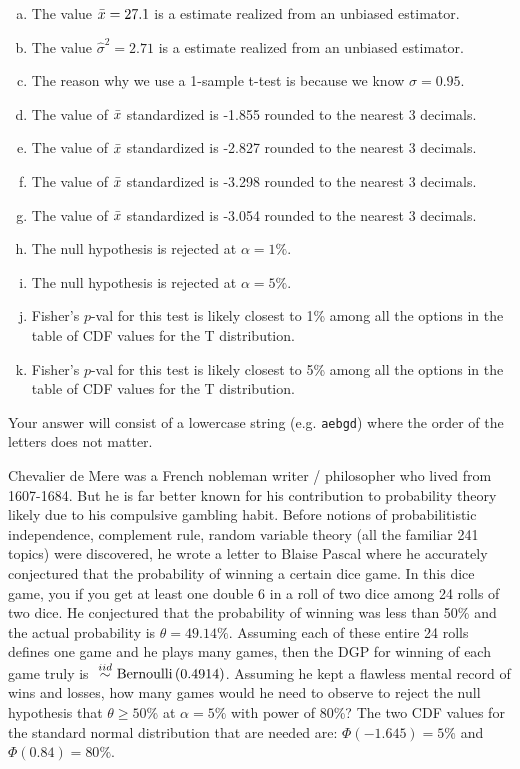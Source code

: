 \documentclass[12pt,landscape]{article}
\newcommand{\instr}{\small Your answer will consist of a lowercase string (e.g. \texttt{aebgd}) where the order of the letters does not matter. \normalsize}
\begin{document}
\begin{enumerate}[(a)]
\item The value $\bar{x} = 27.1$ is a estimate realized from an unbiased estimator.
\item The value $\hat{\sigma}^2 = 2.71$ is a estimate realized from an unbiased estimator.
\item The reason why we use a 1-sample t-test is because we know $\sigma = 0.95$.
\item The value of $\bar{x}$ standardized is -1.855 rounded to the nearest 3 decimals.
\item The value of $\bar{x}$ standardized is -2.827 rounded to the nearest 3 decimals.
\item The value of $\bar{x}$ standardized is -3.298 rounded to the nearest 3 decimals.
\item The value of $\bar{x}$ standardized is -3.054 rounded to the nearest 3 decimals.
\item The null hypothesis is rejected at $\alpha = 1\%$.
\item The null hypothesis is rejected at $\alpha = 5\%$.
\item Fisher's $p$-val for this test is likely closest to 1\% among all the options in the table of CDF values for the T distribution.
\item Fisher's $p$-val for this test is likely closest to 5\% among all the options in the table of CDF values for the T distribution.
\end{enumerate}
\eenum\instr\pagebreak


\problem{} Chevalier de Mere was a French nobleman writer / philosopher who lived from 1607-1684. But he is far better known for his contribution to probability theory likely due to his compulsive gambling habit. Before notions of probabilitistic independence, complement rule, random variable theory (all the familiar 241 topics) were discovered, he wrote a letter to Blaise Pascal where he accurately conjectured that the probability of winning a certain dice game. In this dice game, you  if you get at least one double 6 in a roll of two dice among 24 rolls of two dice. He conjectured that the probability of winning was less than 50\% and the actual probability is $\theta = 49.14\%$. Assuming each of these entire 24 rolls defines one game and he plays many games, then the DGP for winning of each game truly is $\iid \bernoulli{0.4914}$. Assuming he kept a flawless mental record of wins and losses, how many games would he need to observe to reject the null hypothesis that $\theta \geq 50\%$ at $\alpha = 5\%$ with power of 80\%? The two CDF values for the standard normal distribution that are needed are: $\Phi(-1.645)  = 5\%$ and $\Phi(0.84)  = 80\%$. 
\end{document}

